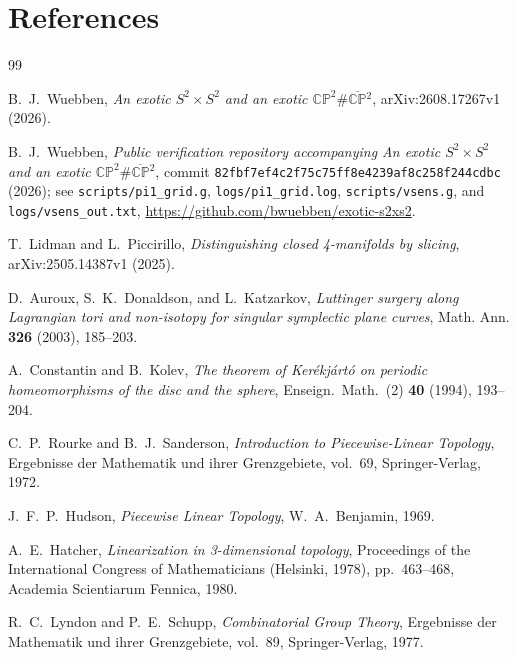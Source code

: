 \documentclass[11pt]{article}
\newcommand{\CP}{\mathbb{CP}}
\theoremstyle{definition}
\begin{document}
\section*{References}
\begingroup
\small
\linespread{1.00}\selectfont
\renewcommand{\section}[2]{}
\begin{thebibliography}{99}
\setlength{\itemsep}{0pt}
\setlength{\parsep}{0pt}

B.~J.~Wuebben,
\emph{An exotic $S^2\times S^2$ and an exotic
$\CP^2\#\overline{\CP}{}^2$},
arXiv:2608.17267v1 (2026).

B.~J.~Wuebben,
\emph{Public verification repository accompanying
An exotic $S^2\times S^2$ and an exotic
$\CP^2\#\overline{\CP}{}^2$},
commit \texttt{82fbf7ef4c2f75c75ff8e4239af8c258f244cdbc} (2026);
see \texttt{scripts/pi1\_grid.g}, \texttt{logs/pi1\_grid.log},
\texttt{scripts/vsens.g}, and \texttt{logs/vsens\_out.txt},
\url{https://github.com/bwuebben/exotic-s2xs2}.

T.~Lidman and L.~Piccirillo,
\emph{Distinguishing closed 4-manifolds by slicing},
arXiv:2505.14387v1 (2025).

D.~Auroux, S.~K.~Donaldson, and L.~Katzarkov,
\emph{Luttinger surgery along Lagrangian tori and non-isotopy for singular
symplectic plane curves},
Math. Ann. \textbf{326} (2003), 185--203.

A.~Constantin and B.~Kolev,
\emph{The theorem of Ker\'ekj\'art\'o on periodic homeomorphisms of the
disc and the sphere},
Enseign.\ Math.\ (2) \textbf{40} (1994), 193--204.

C.~P.~Rourke and B.~J.~Sanderson,
\emph{Introduction to Piecewise-Linear Topology},
Ergebnisse der Mathematik und ihrer Grenzgebiete, vol.~69,
Springer-Verlag, 1972.

J.~F.~P.~Hudson,
\emph{Piecewise Linear Topology}, W.~A.~Benjamin, 1969.

A.~E.~Hatcher,
\emph{Linearization in 3-dimensional topology},
Proceedings of the International Congress of Mathematicians
(Helsinki, 1978), pp.~463--468, Academia Scientiarum Fennica, 1980.

R.~C.~Lyndon and P.~E.~Schupp,
\emph{Combinatorial Group Theory}, Ergebnisse der Mathematik und ihrer
Grenzgebiete, vol.~89, Springer-Verlag, 1977.


\end{thebibliography}
\end{document}
